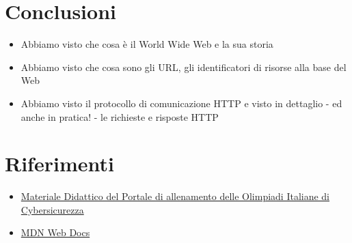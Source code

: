 \documentclass{beamer}
\begin{document}
\section{Conclusioni}
\begin{frame}{\insertsection}
\begin{itemize}
\item Abbiamo visto che cosa è il \alert{World Wide Web} e la sua storia
\item Abbiamo visto che cosa sono gli \alert{URL}, gli identificatori di risorse
alla base del Web
\item Abbiamo visto il protocollo di comunicazione \alert{HTTP} e visto in
dettaglio - ed anche in pratica! - le richieste e risposte HTTP
\end{itemize}
\end{frame}

\section{Riferimenti}
\begin{frame}{\insertsection}
\begin{itemize}
\item \href{https://training.olicyber.it/training}{Materiale Didattico del Portale di allenamento delle Olimpiadi Italiane di Cybersicurezza} 
\item \href{https://developer.mozilla.org/en-US/}{MDN Web Docs} 
\end{itemize}
\end{frame}
\end{document}

